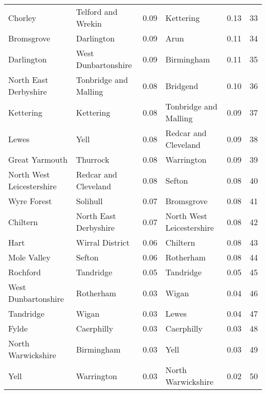 \begin{tabular}{llrlrr}
Chorley                   &         Telford and Wrekin &  0.09 &                  Kettering &    0.13 &    33 \\
Bromsgrove                &                 Darlington &  0.09 &                       Arun &    0.11 &    34 \\
Darlington                &        West Dunbartonshire &  0.09 &                 Birmingham &    0.11 &    35 \\
North East Derbyshire     &      Tonbridge and Malling &  0.08 &                   Bridgend &    0.10 &    36 \\
Kettering                 &                  Kettering &  0.08 &      Tonbridge and Malling &    0.09 &    37 \\
Lewes                     &                       Yell &  0.08 &       Redcar and Cleveland &    0.09 &    38 \\
Great Yarmouth            &                   Thurrock &  0.08 &                 Warrington &    0.09 &    39 \\
North West Leicestershire &       Redcar and Cleveland &  0.08 &                     Sefton &    0.08 &    40 \\
Wyre Forest               &                   Solihull &  0.07 &                 Bromsgrove &    0.08 &    41 \\
Chiltern                  &      North East Derbyshire &  0.07 &  North West Leicestershire &    0.08 &    42 \\
Hart                      &            Wirral District &  0.06 &                   Chiltern &    0.08 &    43 \\
Mole Valley               &                     Sefton &  0.06 &                  Rotherham &    0.08 &    44 \\
Rochford                  &                  Tandridge &  0.05 &                  Tandridge &    0.05 &    45 \\
West Dunbartonshire       &                  Rotherham &  0.03 &                      Wigan &    0.04 &    46 \\
Tandridge                 &                      Wigan &  0.03 &                      Lewes &    0.04 &    47 \\
Fylde                     &                 Caerphilly &  0.03 &                 Caerphilly &    0.03 &    48 \\
North Warwickshire        &                 Birmingham &  0.03 &                       Yell &    0.03 &    49 \\
Yell                      &                 Warrington &  0.03 &         North Warwickshire &    0.02 &    50 \\
\bottomrule
\end{tabular}
